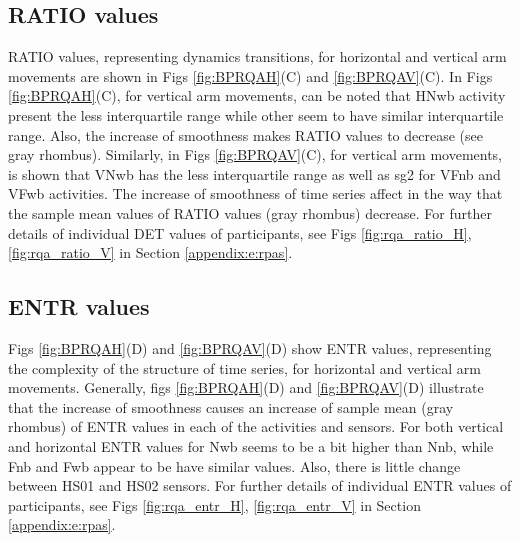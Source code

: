 \subsection*{RATIO values}
RATIO values, representing dynamics transitions, for horizontal and 
vertical arm movements are shown in Figs 
\ref{fig:BPRQAH}(C) and \ref{fig:BPRQAV}(C).
In Figs \ref{fig:BPRQAH}(C), for vertical arm movements, 
can be noted that HNwb activity
present the less interquartile range while other seem to have similar
interquartile range. Also, the increase of smoothness makes RATIO
values to decrease (see gray rhombus).
Similarly, in Figs \ref{fig:BPRQAV}(C), for vertical arm movements, 
is shown that VNwb has the less interquartile range as well as 
sg2 for VFnb and VFwb activities. 
The increase of smoothness of time series affect in the way that 
the sample mean values of RATIO values (gray rhombus) decrease. 
For further details of individual DET values of participants, see 
Figs \ref{fig:rqa_ratio_H}, \ref{fig:rqa_ratio_V} in
Section \ref{appendix:e:rpas}.

\subsection*{ENTR values}
Figs \ref{fig:BPRQAH}(D) and \ref{fig:BPRQAV}(D) show ENTR values, 
representing the complexity of the structure of time series, 
for horizontal and vertical arm movements.
Generally, figs \ref{fig:BPRQAH}(D) and \ref{fig:BPRQAV}(D) 
illustrate that the increase of smoothness causes an increase of 
sample mean (gray rhombus) of ENTR values in each of 
the activities and sensors. 
For both vertical and horizontal ENTR values for Nwb seems 
to be a bit higher than Nnb, while Fnb and Fwb appear to be 
have similar values.
Also, there is little change between HS01 and HS02 sensors.
For further details of individual ENTR values of participants, see 
Figs \ref{fig:rqa_entr_H}, \ref{fig:rqa_entr_V} in
Section \ref{appendix:e:rpas}.


